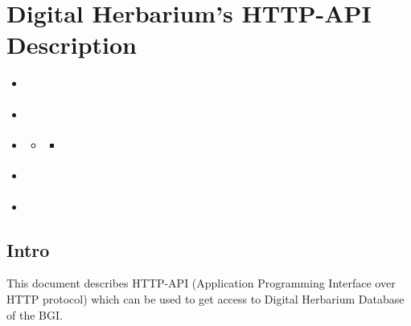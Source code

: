 \documentclass[letterpaper,10pt,english]{sphinxmanual}
\begin{document}
\chapter{Digital Herbarium’s HTTP-API Description}
\label{\detokenize{http_api:digital-herbarium-s-http-api-description}}\label{\detokenize{http_api::doc}}
\begin{sphinxShadowBox}
\begin{itemize}
\item {} 
\label{\detokenize{http_api:id7}}{\hyperref[\detokenize{http_api:intro}]{}}

\item {} 
\label{\detokenize{http_api:id8}}{\hyperref[\detokenize{http_api:description-of-http-request-parameters}]{}}

\item {} 
\label{\detokenize{http_api:id9}}{\hyperref[\detokenize{http_api:description-of-server-response}]{}}
\begin{itemize}
\item {} 
\label{\detokenize{http_api:id10}}{\hyperref[\detokenize{http_api:format-of-the-data-attributes}]{}}
\begin{itemize}
\item {} 
\label{\detokenize{http_api:id11}}{\hyperref[\detokenize{http_api:history-of-species-identifications-and-additional-species}]{}}

\end{itemize}

\end{itemize}

\item {} 
\label{\detokenize{http_api:id12}}{\hyperref[\detokenize{http_api:service-usage-limitations}]{}}

\item {} 
\label{\detokenize{http_api:id13}}{\hyperref[\detokenize{http_api:examples}]{}}

\end{itemize}
\end{sphinxShadowBox}


\section{Intro}
\label{\detokenize{http_api:intro}}
This document describes HTTP-API (Application Programming Interface over HTTP protocol)
which can be used to get access to Digital Herbarium Database of the BGI.
\end{document}
